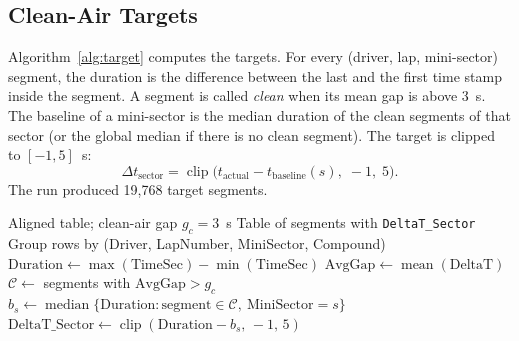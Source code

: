\documentclass[11pt,a4paper]{article}
\begin{document}
\subsection{Clean-Air Targets}
Algorithm~\ref{alg:target} computes the targets. For every (driver, lap,
mini-sector) segment, the duration is the difference between the last and the
first time stamp inside the segment. A segment is called \emph{clean} when its
mean gap is above 3~s. The baseline of a mini-sector is the median duration of
the clean segments of that sector (or the global median if there is no clean
segment). The target is clipped to $[-1, 5]$~s:
\begin{equation}
\Delta t_{\text{sector}} = \operatorname{clip}\bigl(t_{\text{actual}} - t_{\text{baseline}}(s),\; -1,\; 5\bigr).
\end{equation}
The run produced 19{,}768 target segments.

\begin{algorithm}[H]
\caption{Clean-air baseline and delay targets}
\label{alg:target}
\begin{algorithmic}[1]
\Require Aligned table; clean-air gap $g_c = 3$~s
\Ensure Table of segments with \texttt{DeltaT\_Sector}
\State Group rows by (Driver, LapNumber, MiniSector, Compound)
  \State $\text{Duration} \gets \max(\text{TimeSec}) - \min(\text{TimeSec})$
  \State $\text{AvgGap} \gets \operatorname{mean}(\text{DeltaT})$
\EndFor
\State $\mathcal{C} \gets$ segments with $\text{AvgGap} > g_c$ 
  \State $b_s \gets \operatorname{median}\{\text{Duration} : \text{segment} \in \mathcal{C},\ \text{MiniSector}=s\}$
\EndFor
\State $\text{DeltaT\_Sector} \gets \operatorname{clip}(\text{Duration} - b_{s},\,-1,\,5)$
\end{algorithmic}
\end{algorithm}
\end{document}
